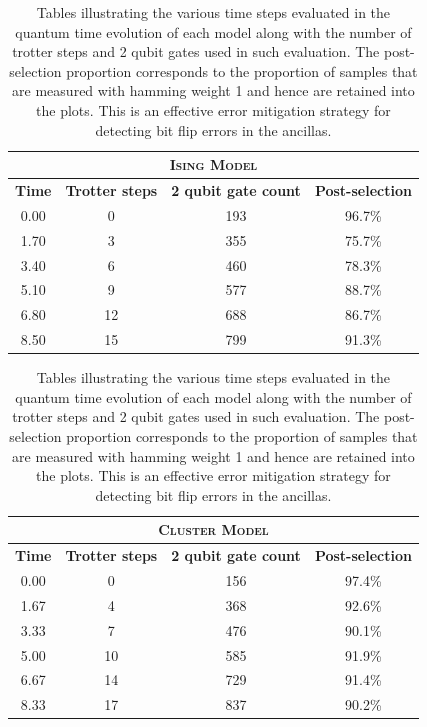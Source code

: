 \documentclass[aps,floatfix,10pt,amssymb,amsfont,amsmath,superscriptaddress,float,nofootinbib,longbibliography,nobalancelastpage,twocolumn]{revtex4-2}
\begin{document}
\begin{table}[htbp]
    \centering
    \begin{tabular}{|c|c|c|c|}
    \hline
        \multicolumn{4}{|c|}{\textsc{Ising Model}} \\\hline
         \textbf{Time}& \textbf{Trotter steps}&\textbf{2 qubit gate count}&\textbf{Post-selection}  \\\hline
         0.00&0&193&96.7\%\\\hline
         1.70&3&355&75.7\%\\\hline
         3.40&6&460&78.3\%\\\hline
         5.10&9&577&88.7\%\\\hline
         6.80&12&688&86.7\%\\\hline
         8.50&15&799&91.3\%\\\hline
    \end{tabular}\vspace{1cm}
    \begin{tabular}{|c|c|c|c|}
    \hline
     \multicolumn{4}{|c|}{\textsc{Cluster Model}} \\\hline
         \textbf{Time}& \textbf{Trotter steps}&\textbf{2 qubit gate count}&\textbf{Post-selection}  \\\hline
         0.00&0&156&97.4\%\\\hline
         1.67&4&368&92.6\%\\\hline
         3.33& 7&476&90.1\%\\\hline
         5.00&10&585&91.9\%\\\hline
         6.67&14&729&91.4\%\\\hline
         8.33&17&837&90.2\%\\\hline
    \end{tabular}
    \caption{Tables illustrating the various time steps evaluated in the quantum time evolution of each model along with the number of trotter steps and 2 qubit gates used in such evaluation. The post-selection proportion corresponds to the proportion of samples that are measured with hamming weight 1 and hence are retained into the plots. This is an effective error mitigation strategy for detecting bit flip errors in the ancillas.}
    \label{tab:trotter_steps}
\end{table}
\end{document}
